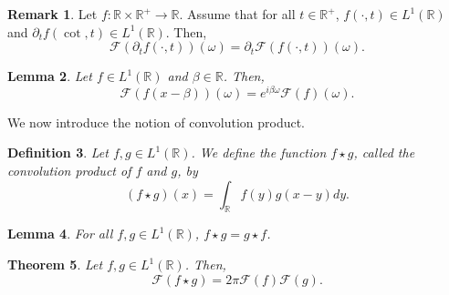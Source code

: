 \documentclass{article}
\newtheorem{theorem}{Theorem}[subsection] %
\newtheorem{lemma}[theorem]{Lemma}
\newtheorem{definition}[theorem]{Definition}
\theoremstyle{definition}
\theoremstyle{definition}
\newtheorem{remark}[theorem]{Remark}
\newcommand{\R}{\mathbb{R}}
\begin{document}
\begin{remark}
    Let $f:\R\times \R^+\to \R$. Assume that for all $t\in \R^+$, $f(\cdot,t)\in L^1(\R)$ and $\partial_{t}f(\cot,t)\in L^1(\R)$. Then,
    $$\mathcal{F}(\partial_{t}f(\cdot,t))(\omega)=\partial_{t}\mathcal{F}(f(\cdot,t))(\omega).$$
\end{remark}
\begin{lemma}
    Let $f\in L^1(\R)$ and $\beta\in \R$. Then,
    $$\mathcal{F}(f(x-\beta))(\omega)=e^{i\beta \omega}\mathcal{F}(f)(\omega).$$
\end{lemma}
We now introduce the notion of convolution product.
\begin{definition}
    Let $f,g\in L^1(\R)$. We define the function $f\star g$, called the convolution product of $f$ and $g$, by
    $$(f\star g)(x)=\int_{\R}f(y)g(x-y)dy.$$
\end{definition}
\begin{lemma}
    For all $f,g\in L^1(\R)$, $f\star g=g\star f$.
\end{lemma}
\begin{theorem}
    Let $f,g\in L^1(\R)$. Then,
    $$\mathcal{F}(f\star g)=2\pi \mathcal{F}(f)\mathcal{F}(g).$$
\end{theorem}
\end{document}
